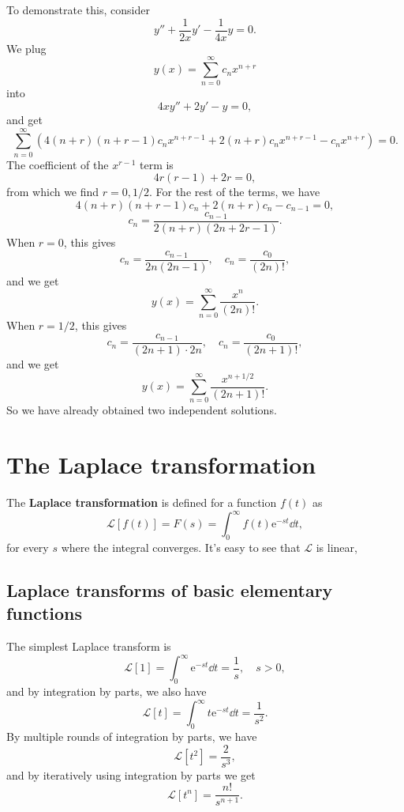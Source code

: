 \documentclass[hyperref, a4paper]{article}
\newcommand*{\ee}{\mathrm{e}}
\newcommand*{\concept}[1]{{\textbf{#1}}}
\newcommand*{\laplace}{\mathcal{L}}
\begin{document}
To demonstrate this, 
consider 
\begin{equation}
    y'' + \frac{1}{2x} y' - \frac{1}{4x} y = 0.
\end{equation}
We plug 
\[
    y(x) = \sum_{n=0}^\infty c_n x^{n + r}
\]
into 
\[
    4 x y'' + 2 y' - y = 0,
\]
and get 
\[
    \sum_{n=0}^\infty \left(
        4 (n + r) (n + r - 1) c_n x^{n + r - 1}
        + 2 (n + r) c_n x^{n + r - 1} 
        - c_n x^{n + r}
    \right) = 0.
\]
The coefficient of the $x^{r-1}$ term is 
\[
    4 r (r - 1) + 2 r = 0,
\]
from which we find $r = 0, 1/2$.
For the rest of the terms, we have 
\[
    4 (n + r) (n + r - 1) c_n
    + 2 (n + r) c_n
    - c_{n-1} = 0,
\]
\[
    c_n = \frac{c_{n-1}}{2 (n + r) (2 n + 2 r - 1)}.
\]
When $r = 0$, this gives 
\[
    c_n = \frac{c_{n-1}}{2n (2n - 1)} , \quad 
    c_n = \frac{c_0}{(2n)!},
\]
and we get 
\begin{equation}
    y(x) = \sum_{n=0}^\infty \frac{x^n}{(2n)!}.
\end{equation}
When $r = 1/2$, this gives 
\[
    c_n = \frac{c_{n-1}}{(2n + 1) \cdot 2n}, \quad 
    c_n = \frac{c_0}{(2 n + 1)!},
\]
and we get 
\begin{equation}
    y(x) = \sum_{n=0}^\infty \frac{x^{n + 1/2}}{(2 n + 1)!}.
\end{equation}
So we have already obtained two independent solutions. 

\section{The Laplace transformation}

The \concept{Laplace transformation} is defined for a function $f(t)$ as 
\begin{equation}
    \mathcal{L}[f(t)] = F(s) = \int_{0}^{\infty} f(t) \ee^{-st} \dd{t},
\end{equation}
for every $s$ where the integral converges. 
It's easy to see that $\mathcal{L}$ is linear, 

\subsection{Laplace transforms of basic elementary functions}

The simplest Laplace transform is 
\begin{equation}
    \mathcal{L}[1] = \int_{0}^{\infty} \ee^{-st} \dd{t} = \frac{1}{s},
    \quad s > 0,
\end{equation}
and by integration by parts, we also have 
\begin{equation}
    \laplace[t] = \int_{0}^{\infty} t \ee^{-st} \dd{t}
    = \frac{1}{s^2}.
\end{equation}
By multiple rounds of integration by parts, we have 
\begin{equation}
    \laplace[t^2] = \frac{2}{s^3},
\end{equation}
and by iteratively using integration by parts we get 
\begin{equation}
    \laplace [t^n] = \frac{n!}{s^{n+1}}.
\end{equation}
\end{document}
